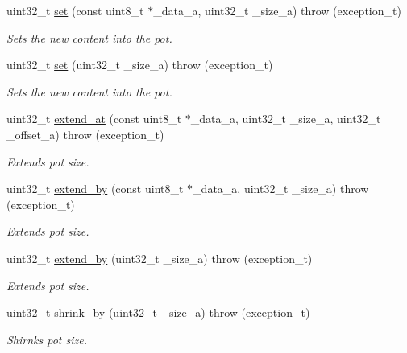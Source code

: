 \begin{DoxyCompactItemize}
\item 
uint32\+\_\+t \hyperlink{class_n_h_1_1_protocols_1_1_raw_1_1pot__t_a40bf65465fc5c89912115c60202f8cbb}{set} (const uint8\+\_\+t $\ast$\+\_\+data\+\_\+a, uint32\+\_\+t \+\_\+size\+\_\+a)  throw (exception\+\_\+t)
\begin{DoxyCompactList}\small\item\em Sets the new content into the pot. \end{DoxyCompactList}\item 
uint32\+\_\+t \hyperlink{class_n_h_1_1_protocols_1_1_raw_1_1pot__t_af4d6f1f0181d26d78e4e5d3a7394170b}{set} (uint32\+\_\+t \+\_\+size\+\_\+a)  throw (exception\+\_\+t)
\begin{DoxyCompactList}\small\item\em Sets the new content into the pot. \end{DoxyCompactList}\item 
uint32\+\_\+t \hyperlink{class_n_h_1_1_protocols_1_1_raw_1_1pot__t_a3ede3b9e59f9c79c27aeb9fc94b31c2e}{extend\+\_\+at} (const uint8\+\_\+t $\ast$\+\_\+data\+\_\+a, uint32\+\_\+t \+\_\+size\+\_\+a, uint32\+\_\+t \+\_\+offset\+\_\+a)  throw (exception\+\_\+t)
\begin{DoxyCompactList}\small\item\em Extends pot size. \end{DoxyCompactList}\item 
uint32\+\_\+t \hyperlink{class_n_h_1_1_protocols_1_1_raw_1_1pot__t_a9a4d54dbbffeffaa1b5bf326ace30e8b}{extend\+\_\+by} (const uint8\+\_\+t $\ast$\+\_\+data\+\_\+a, uint32\+\_\+t \+\_\+size\+\_\+a)  throw (exception\+\_\+t)
\begin{DoxyCompactList}\small\item\em Extends pot size. \end{DoxyCompactList}\item 
uint32\+\_\+t \hyperlink{class_n_h_1_1_protocols_1_1_raw_1_1pot__t_a117097de61aa7d027381628d165a0ad2}{extend\+\_\+by} (uint32\+\_\+t \+\_\+size\+\_\+a)  throw (exception\+\_\+t)
\begin{DoxyCompactList}\small\item\em Extends pot size. \end{DoxyCompactList}\item 
uint32\+\_\+t \hyperlink{class_n_h_1_1_protocols_1_1_raw_1_1pot__t_ad705615b0cf4d0d7fe3ed4957711dbc4}{shrink\+\_\+by} (uint32\+\_\+t \+\_\+size\+\_\+a)  throw (exception\+\_\+t)
\begin{DoxyCompactList}\small\item\em Shirnks pot size. \end{DoxyCompactList}\item 

\end{DoxyCompactItemize}
